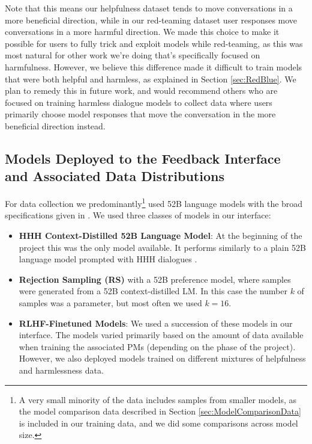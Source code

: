 Note that this means our helpfulness dataset tends to move conversations in a more beneficial direction, while in our red-teaming dataset user responses move conversations in a more harmful direction.  We made this choice to make it possible for users to fully trick and exploit models while red-teaming, as this was most natural for other work we're doing that's specifically focused on harmfulness.  However, we believe this difference made it difficult to train models that were both helpful and harmless, as explained in Section \ref{sec:RedBlue}.  We plan to remedy this in future work, and would recommend others who are focused on training harmless dialogue models to collect data where users primarily choose model responses that move the conversation in the more beneficial direction instead.

\subsection{Models Deployed to the Feedback Interface and Associated Data Distributions}
\label{sec:ModelsandSubdistributions}

For data collection we predominantly\footnote{A very small minority of the data includes samples from smaller models, as the model comparison data described in Section \ref{sec:ModelComparisonData} is included in our training data, and we did some comparisons across model size. } used 52B language models with the broad specifications given in \cite{askell2021general}. We used three classes of models in our interface:

\begin{itemize}
    \item {\bf HHH Context-Distilled 52B Language Model}: At the beginning of the project this was the only model available.  It  performs similarly to a plain 52B language model prompted with HHH dialogues \cite{askell2021general}.
    \item {\bf Rejection Sampling (RS)} with a 52B preference model, where samples were generated from a 52B context-distilled LM.  In this case the number $k$ of samples was a parameter, but most often we used $k=16$.
    \item  {\bf RLHF-Finetuned Models}:  We used a succession of these models in our interface.  The models varied primarily based on the amount of data available when training the associated PMs (depending on the phase of the project).  However, we also deployed models trained on different mixtures of helpfulness and harmlessness data.
\end{itemize}

